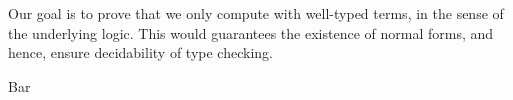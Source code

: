 
Our goal is to prove that we only compute with well-typed terms, in the sense
of the underlying logic. This would guarantees the existence of normal forms,
and hence, ensure decidability of type checking.

\begin{theorem}[Foo]
    Bar
\end{theorem}
